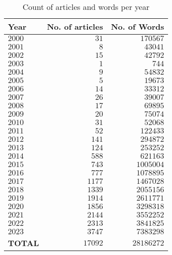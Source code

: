\begin{table}[H]
  \label{tab:data-analytics}
  \centering
  \begin{tabular}{l | r | r}
    \toprule
    \textbf{Year} & \textbf{No. of articles} & \textbf{No. of Words} \\
    \midrule
    $2000$ & $31$ & $170567$ \\
    $2001$ & $8$ & $43041$ \\
    $2002$ & $15$ & $42792$ \\
    $2003$ & $1$ & $744$ \\
    $2004$ & $9$ & $54832$ \\
    \midrule
    $2005$ & $5$ & $19673$ \\
    $2006$ & $14$ & $33312$ \\
    $2007$ & $26$ & $39007$ \\
    $2008$ & $17$ & $69895$ \\
    $2009$ & $20$ & $75074$ \\
    \midrule
    $2010$ & $31$ & $52068$ \\
    $2011$ & $52$ & $122433$ \\
    $2012$ & $141$ & $294872$ \\
    $2013$ & $124$ & $253252$ \\
    $2014$ & $588$ & $621163$ \\
    \midrule
    $2015$ & $743$ & $1005004$ \\
    $2016$ & $777$ & $1078895$ \\
    $2017$ & $1177$ & $1467028$ \\
    $2018$ & $1339$ & $2055156$ \\
    $2019$ & $1914$ & $2611771$ \\
    \midrule
    $2020$ & $1856$ & $3298318$ \\
    $2021$ & $2144$ & $3552252$ \\
    $2022$ & $2313$ & $3841825$ \\
    $2023$ & $3747$ & $7383298$ \\
    \midrule
    \textbf{TOTAL} & $17092$ & $28186272$ \\
    \toprule
  \end{tabular}
  \caption{Count of articles and words per year}
  \label{tab:count-articles-words}
\end{table}

